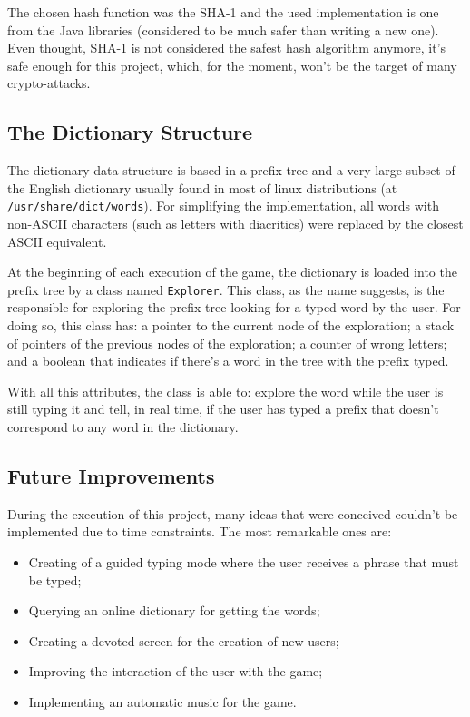 \documentclass[a4paper,12pt,twoside]{article}
\begin{document}
			The chosen hash function was the SHA-1 and the used implementation is one from the Java libraries (considered to be much safer than writing a new one). Even thought, SHA-1 is not considered the safest hash algorithm anymore, it's safe enough for this project, which, for the moment, won't be the target of many crypto-attacks.
		
		\subsection{The Dictionary Structure}
		
			The dictionary data structure is based in a prefix tree and a very large subset of the English dictionary usually found in most of linux distributions (at \texttt{/usr/share/dict/words}). For simplifying the implementation, all words with non-ASCII characters (such as letters with diacritics) were replaced by the closest ASCII equivalent. 
			
			At the beginning of each execution of the game, the dictionary is loaded into the prefix tree by a class named \texttt{Explorer}. This class, as the name suggests, is the responsible for exploring the prefix tree looking for a typed word by the user. For doing so, this class has: a pointer to the current node of the exploration; a stack of pointers of the previous nodes of the exploration; a counter of wrong letters; and a boolean that indicates if there's a word in the tree with the prefix typed.
			
			With all this attributes, the class is able to: explore the word while the user is still typing it and tell, in real time, if the user has typed a prefix that doesn't correspond to any word in the dictionary. 
			
		\subsection{Future Improvements}
			
			During the execution of this project, many ideas that were conceived couldn't be implemented due to time constraints. The most remarkable ones are:
			
			\begin{itemize}
				\item Creating of a guided typing mode where the user receives a phrase that must be typed;
				\item Querying an online dictionary for getting the words;
				\item Creating a devoted screen for the creation of new users;
				\item Improving the interaction of the user with the game;
				\item Implementing an automatic music for the game.
			\end{itemize}
			
\end{document}
